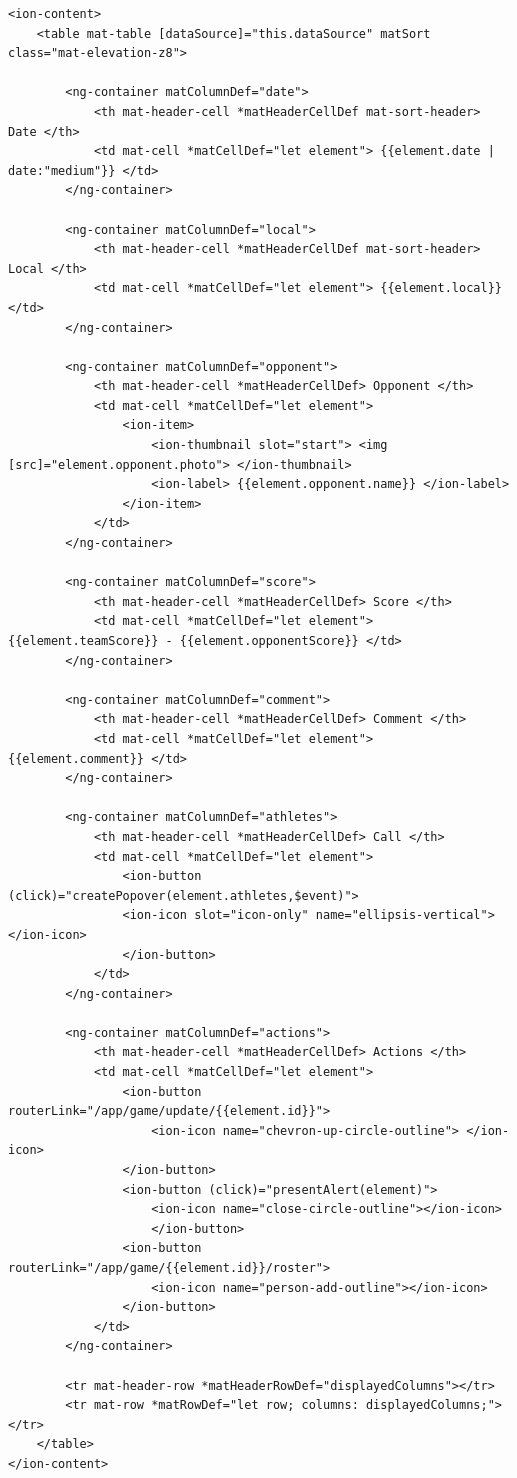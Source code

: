 \begin{lstlisting}
<ion-content>
	<table mat-table [dataSource]="this.dataSource" matSort class="mat-elevation-z8">
	
		<ng-container matColumnDef="date">
			<th mat-header-cell *matHeaderCellDef mat-sort-header> Date </th>
			<td mat-cell *matCellDef="let element"> {{element.date | date:"medium"}} </td>
		</ng-container>
		
		<ng-container matColumnDef="local">
			<th mat-header-cell *matHeaderCellDef mat-sort-header> Local </th>
			<td mat-cell *matCellDef="let element"> {{element.local}} </td>
		</ng-container>
		
		<ng-container matColumnDef="opponent">
			<th mat-header-cell *matHeaderCellDef> Opponent </th>
			<td mat-cell *matCellDef="let element">
				<ion-item>
					<ion-thumbnail slot="start"> <img [src]="element.opponent.photo"> </ion-thumbnail>
					<ion-label> {{element.opponent.name}} </ion-label>
				</ion-item>
			</td>
		</ng-container>
		
		<ng-container matColumnDef="score">
			<th mat-header-cell *matHeaderCellDef> Score </th>
			<td mat-cell *matCellDef="let element"> {{element.teamScore}} - {{element.opponentScore}} </td>
		</ng-container>
		
		<ng-container matColumnDef="comment">
			<th mat-header-cell *matHeaderCellDef> Comment </th>
			<td mat-cell *matCellDef="let element"> {{element.comment}} </td>
		</ng-container>
		
		<ng-container matColumnDef="athletes">
			<th mat-header-cell *matHeaderCellDef> Call </th>
			<td mat-cell *matCellDef="let element">
				<ion-button (click)="createPopover(element.athletes,$event)">
				<ion-icon slot="icon-only" name="ellipsis-vertical"></ion-icon>
				</ion-button>
			</td>
		</ng-container>
		
		<ng-container matColumnDef="actions">
			<th mat-header-cell *matHeaderCellDef> Actions </th>
			<td mat-cell *matCellDef="let element">
				<ion-button routerLink="/app/game/update/{{element.id}}">
					<ion-icon name="chevron-up-circle-outline"> </ion-icon>
				</ion-button>
				<ion-button (click)="presentAlert(element)">
					<ion-icon name="close-circle-outline"></ion-icon>
					</ion-button>
				<ion-button routerLink="/app/game/{{element.id}}/roster">
					<ion-icon name="person-add-outline"></ion-icon>
				</ion-button>
			</td>
		</ng-container>
		
		<tr mat-header-row *matHeaderRowDef="displayedColumns"></tr>
		<tr mat-row *matRowDef="let row; columns: displayedColumns;"></tr>
	</table>
</ion-content>
\end{lstlisting}
